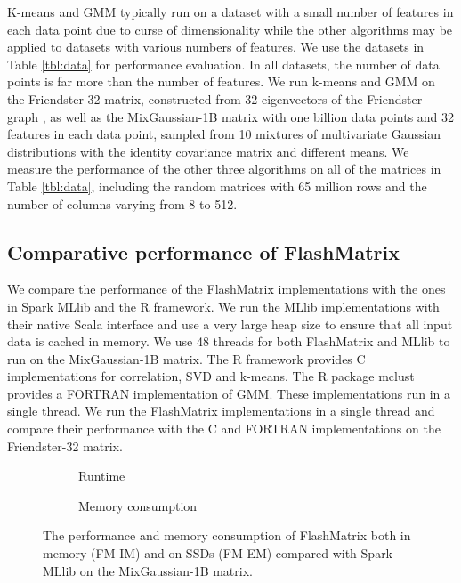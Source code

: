 K-means and GMM typically run on a dataset with a small number of features
in each data point due to curse of dimensionality \cite{Jain00} while
the other algorithms may be applied to datasets with various numbers of
features. We use the datasets in Table \ref{tbl:data} for performance
evaluation. In all datasets, the number of data points is far more than
the number of features. We run k-means and GMM on
the Friendster-32 matrix, constructed from 32 eigenvectors of the Friendster
graph \cite{friendster}, as well as the MixGaussian-1B matrix with one billion
data points and 32 features in each data point, sampled from 10 mixtures of
multivariate Gaussian distributions
with the identity covariance matrix and different means. We measure the performance
of the other three algorithms on all of the matrices in Table \ref{tbl:data},
including the random matrices with 65 million rows and the number of columns
varying from 8 to 512.

\subsection{Comparative performance of FlashMatrix}

We compare the performance of the FlashMatrix implementations with the ones in
Spark MLlib \cite{mllib} and the R framework. We run the MLlib implementations
with their native Scala interface and use a very large heap size to ensure that
all input data is cached in memory. We use 48 threads for both FlashMatrix and
MLlib to run on the MixGaussian-1B matrix.
The R framework provides C implementations for correlation, SVD and k-means.
The R package mclust \cite{mclust} provides a FORTRAN implementation of GMM.
These implementations run in a single thread. We run the FlashMatrix
implementations in a single thread and compare their performance with the C and
FORTRAN implementations on the Friendster-32 matrix.

\begin{figure}
	\centering
	\footnotesize
	\vspace{-15pt}
	\begin{subfigure}{.5\textwidth}
		
		\label{perf:rt}
		\vspace{-15pt}
		\caption{Runtime}
	\end{subfigure}

	\begin{subfigure}{.5\textwidth}
		
		\label{perf:mem}
		\vspace{-15pt}
		\caption{Memory consumption}
	\end{subfigure}
	\caption{The performance and memory consumption of FlashMatrix both
		in memory (FM-IM) and on SSDs (FM-EM) compared with Spark MLlib
		on the MixGaussian-1B matrix.}
	\label{perf:fm}
\end{figure}

